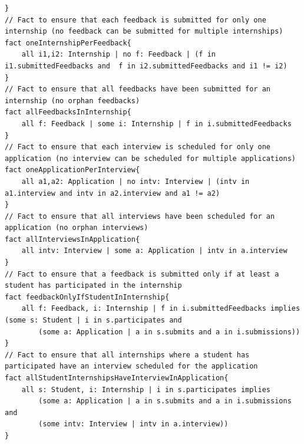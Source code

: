 \begin{lstlisting}
}
// Fact to ensure that each feedback is submitted for only one internship (no feedback can be submitted for multiple internships)
fact oneInternshipPerFeedback{
    all i1,i2: Internship | no f: Feedback | (f in i1.submittedFeedbacks and  f in i2.submittedFeedbacks and i1 != i2)
}
// Fact to ensure that all feedbacks have been submitted for an internship (no orphan feedbacks)
fact allFeedbacksInInternship{
    all f: Feedback | some i: Internship | f in i.submittedFeedbacks
}
// Fact to ensure that each interview is scheduled for only one application (no interview can be scheduled for multiple applications)
fact oneApplicationPerInterview{
    all a1,a2: Application | no intv: Interview | (intv in a1.interview and intv in a2.interview and a1 != a2)
}
// Fact to ensure that all interviews have been scheduled for an application (no orphan interviews)
fact allInterviewsInApplication{
    all intv: Interview | some a: Application | intv in a.interview
}
// Fact to ensure that a feedback is submitted only if at least a student has participated in the internship
fact feedbackOnlyIfStudentInInternship{
    all f: Feedback, i: Internship | f in i.submittedFeedbacks implies (some s: Student | i in s.participates and 
        (some a: Application | a in s.submits and a in i.submissions))
}
// Fact to ensure that all internships where a student has participated have an interview scheduled for the application
fact allStudentInternshipsHaveInterviewInApplication{
    all s: Student, i: Internship | i in s.participates implies 
        (some a: Application | a in s.submits and a in i.submissions and 
        (some intv: Interview | intv in a.interview))
}
\end{lstlisting}

